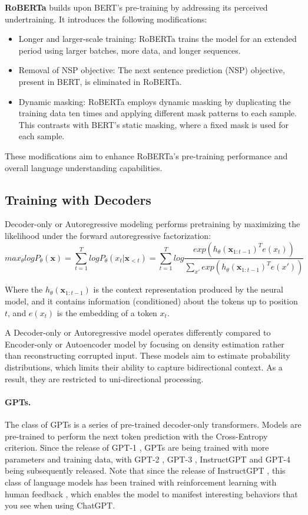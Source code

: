 \textbf{RoBERTa} \cite{liu2019roberta} builds upon BERT's pre-training by addressing its perceived undertraining. It introduces the following modifications:
\begin{itemize}
    \item Longer and larger-scale training: RoBERTa trains the model for an extended period using larger batches, more data, and longer sequences.
    \item Removal of NSP objective: The next sentence prediction (NSP) objective, present in BERT, is eliminated in RoBERTa.
    \item Dynamic masking: RoBERTa employs dynamic masking by duplicating the training data ten times and applying different mask patterns to each sample. This contrasts with BERT's static masking, where a fixed mask is used for each sample.
\end{itemize}
These modifications aim to enhance RoBERTa's pre-training performance and overall language understanding capabilities.




\subsection{Training with Decoders}
Decoder-only or Autoregressive modeling performs
pretraining by maximizing the likelihood under the forward autoregressive factorization:
$$
max_{\theta}logP_{\theta}(\textbf{x})=\sum_{t=1}^TlogP_{\theta}(x_t|\textbf{x}_{<t})
= \sum_{t=1}^T{log\frac{exp(h_{\theta}(\textbf{x}_{1:t-1})^Te(x_t))}{\sum_{x\prime}exp(h_{\theta}(\textbf{x}_{1:t-1})^Te(x\prime))}}
$$

Where the $h_{\theta}(\textbf{x}_{1:t-1})$ is the context representation produced by the neural model, and it contains information (conditioned) about the tokens up to position $t$, and $e(x_t)$ is the embedding of a token $x_t$.

A Decoder-only or Autoregressive model operates differently compared to Encoder-only or Autoencoder model by focusing on density estimation rather than reconstructing corrupted input. These models aim to estimate probability distributions, which limits their ability to capture bidirectional context. As a result, they are restricted to uni-directional processing.

\paragraph{GPTs.} The class of GPTs is a series of pre-trained decoder-only transformers. Models are pre-trained to perform the next token prediction with the Cross-Entropy criterion. Since the release of GPT-1 \citep{gpt-1}, GPTs are being trained with more parameters and training data, with GPT-2 \citep{gpt-2}, GPT-3 
\citep{gpt-3}, InstructGPT \citep{instructgpt} and GPT-4 \citep{gpt-4} being subsequently released. Note that since the release of InstructGPT \citep{instructgpt}, this class of language models has been trained with reinforcement learning with human feedback \citep{rlhf}, which enables the model to manifest interesting behaviors that you see when using ChatGPT.


